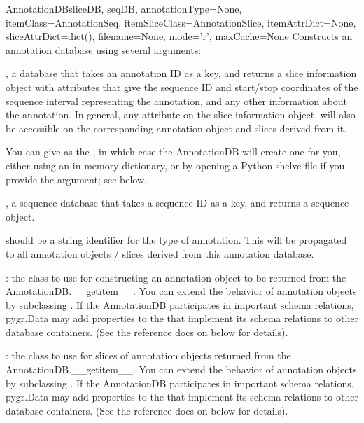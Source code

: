 \documentclass{howto}
\begin{document}
\begin{funcdesc}{AnnotationDB}{sliceDB, seqDB, annotationType=None, itemClass=AnnotationSeq, itemSliceClass=AnnotationSlice, itemAttrDict=None, sliceAttrDict=dict(), filename=None, mode='r', maxCache=None}
  Constructs an annotation database using several arguments:

  , a database that takes an annotation ID as a key, and returns
  a slice information object with attributes that give the sequence ID and start/stop
  coordinates of the sequence interval representing the annotation,
  and any other information about the annotation.  In general, any
  attribute on the slice information object, will also be accessible
  on the corresponding annotation object and slices derived from it.

  You can give  as the , in which case the
  AnnotationDB will create one for you, either using an in-memory dictionary,
  or by opening a Python shelve file if you provide the  argument;
  see below.

  , a sequence database that takes a sequence ID as a key, and
  returns a sequence object.

   should be a string identifier for the type of
  annotation.  This will be propagated to all annotation objects / slices
  derived from this annotation database.

  : the class to use for constructing an annotation object 
  to be returned from the AnnotationDB.__getitem__.  You can extend the
  behavior of annotation objects by subclassing .
  If the AnnotationDB participates in important schema relations,
  pygr.Data may add properties to the  that implement
  its schema relations to other database containers.  (See the reference
  docs on  below for details).

  : the class to use for slices of annotation
  objects returned from the AnnotationDB.__getitem__.  You can extend the
  behavior of annotation objects by subclassing .
  If the AnnotationDB participates in important schema relations,
  pygr.Data may add properties to the  that implement
  its schema relations to other database containers.  (See the reference
  docs on  below for details).


\end{funcdesc}
\end{document}
